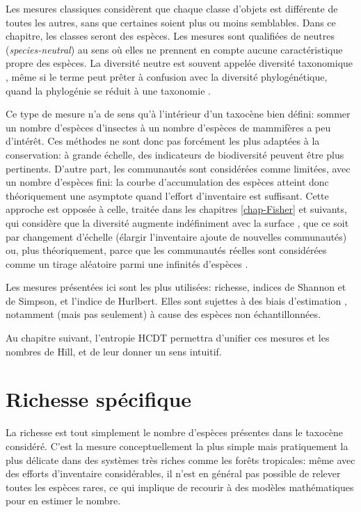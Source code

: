 \documentclass[
  11pt,
  french,
  a4paper,
  extrafontsizes,onecolumn,openright
  ]{memoir}
\newlength{\rf}
\begin{document}
\normalsize

Les mesures classiques \autocite{Peet1974} considèrent que chaque classe d'objets est différente de toutes les autres, sans que certaines soient plus ou moins semblables.
Dans ce chapitre, les classes seront des espèces.
Les mesures sont qualifiées de neutres (\emph{species-neutral}) au sens où elles ne prennent en compte aucune caractéristique propre des espèces.
La diversité neutre est souvent appelée diversité taxonomique \autocite{Devictor2010,Stegen2011}, même si le terme peut prêter à confusion avec la diversité phylogénétique, quand la phylogénie se réduit à une taxonomie \autocite{Clarke2001,Ricotta2003c}.

Ce type de mesure n'a de sens qu'à l'intérieur d'un taxocène bien défini: sommer un nombre d'espèces d'insectes à un nombre d'espèces de mammifères a peu d'intérêt.
Ces méthodes ne sont donc pas forcément les plus adaptées à la conservation: à grande échelle, des indicateurs de biodiversité \autocite{Balmford2003} peuvent être plus pertinents.
D'autre part, les communautés sont considérées comme limitées, avec un nombre d'espèces fini: la courbe d'accumulation des espèces atteint donc théoriquement une asymptote quand l'effort d'inventaire est suffisant.
Cette approche est opposée à celle, traitée dans les chapitres \ref{chap-Fisher} et suivants, qui considère que la diversité augmente indéfiniment avec la surface \autocite{Williamson2001}, que ce soit par changement d'échelle (élargir l'inventaire ajoute de nouvelles communautés) ou, plus théoriquement, parce que les communautés réelles sont considérées comme un tirage aléatoire parmi une infinités d'espèces \autocite{Fisher1943}.

Les mesures présentées ici sont les plus utilisées: richesse, indices de Shannon et de Simpson, et l'indice de Hurlbert.
Elles sont sujettes à des biais d'estimation \autocite{Mouillot1999}, notamment (mais pas seulement) à cause des espèces non échantillonnées.

Au chapitre suivant, l'entropie HCDT permettra d'unifier ces mesures et les nombres de Hill, et de leur donner un sens intuitif.

\hypertarget{sec-Richesse}{%
\section{Richesse spécifique}\label{sec-Richesse}}

La richesse est tout simplement le nombre d'espèces présentes dans le taxocène considéré.
C'est la mesure conceptuellement la plus simple mais pratiquement la plus délicate dans des systèmes très riches comme les forêts tropicales: même avec des efforts d'inventaire considérables, il n'est en général pas possible de relever toutes les espèces rares, ce qui implique de recourir à des modèles mathématiques pour en estimer le nombre.
\end{document}
